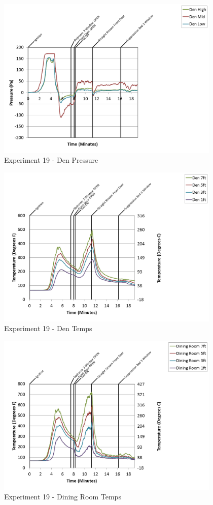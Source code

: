 \documentclass{article}
\begin{document}
\begin{appendices}
\begin{figure}[h!]
	\centering
	\includegraphics[height=3.05in]{0_Images/Results_Charts/Exp_19_Charts/DenPressure.png}
	\caption{Experiment 19 - Den Pressure}
\end{figure}

\clearpage

\begin{figure}[h!]
	\centering
	\includegraphics[height=3.05in]{0_Images/Results_Charts/Exp_19_Charts/DenTemps.png}
	\caption{Experiment 19 - Den Temps}
\end{figure}


\begin{figure}[h!]
	\centering
	\includegraphics[height=3.05in]{0_Images/Results_Charts/Exp_19_Charts/DiningRoomTemps.png}
	\caption{Experiment 19 - Dining Room Temps}
\end{figure}


\end{appendices}
\end{document}

